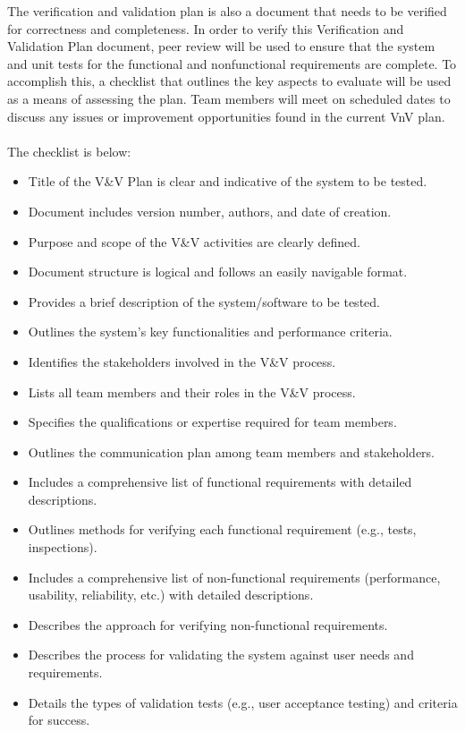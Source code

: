 \documentclass[12pt, titlepage]{article}
\begin{document}
The verification and validation plan is also a document that needs to be verified for correctness and completeness. In order to verify this Verification and Validation Plan document, peer review will be used to ensure that the system and unit tests for the functional and nonfunctional requirements are complete. To accomplish this, a checklist that outlines the key aspects to evaluate will be used as a means of assessing the plan. Team members will meet on scheduled dates to discuss any issues or improvement opportunities found in the current VnV plan.
\\ \\
The checklist is below:
\begin{itemize}
    \item Title of the V\&V Plan is clear and indicative of the system to be tested.
    \item Document includes version number, authors, and date of creation.
    \item Purpose and scope of the V\&V activities are clearly defined.
    \item Document structure is logical and follows an easily navigable format.
    \item Provides a brief description of the system/software to be tested.
    \item Outlines the system's key functionalities and performance criteria.
    \item Identifies the stakeholders involved in the V\&V process.
     \item Lists all team members and their roles in the V\&V process.
    \item Specifies the qualifications or expertise required for team members.
    \item Outlines the communication plan among team members and stakeholders.
     \item Includes a comprehensive list of functional requirements with detailed descriptions.
    \item Outlines methods for verifying each functional requirement (e.g., tests, inspections).
    \item Includes a comprehensive list of non-functional requirements (performance, usability, reliability, etc.) with detailed descriptions.
    \item Describes the approach for verifying non-functional requirements.
     \item Describes the process for validating the system against user needs and requirements.
    \item Details the types of validation tests (e.g., user acceptance testing) and criteria for success.

\end{itemize}
\end{document}

